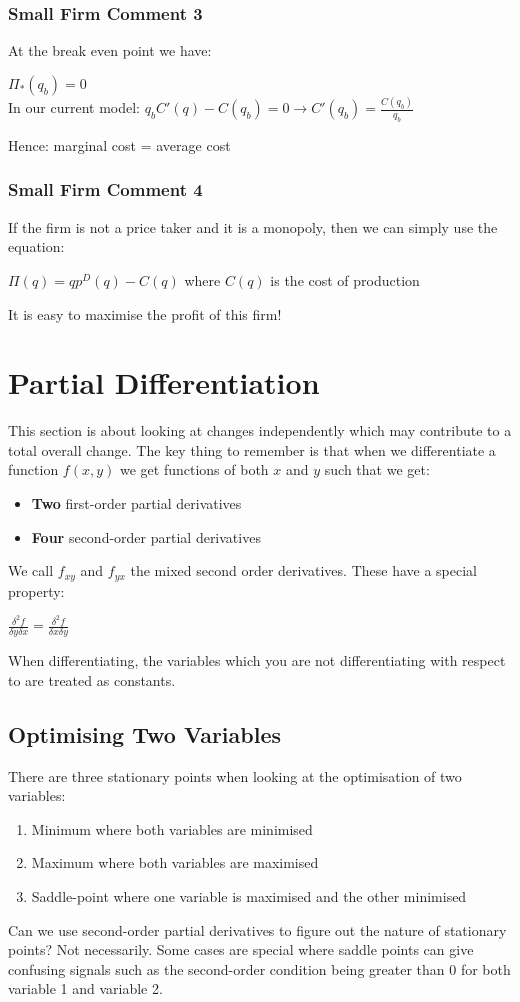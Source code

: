 \documentclass[12pt, letterpaper]{article}
\begin{document}
\subsubsection{Small Firm Comment 3}
At the break even point we have:
\begin{center}
	$\Pi_*(q_b)=0$\\
	In our current model: $q_bC'(q)-C(q_b)=0 \rightarrow C'(q_b)=\frac{C(q_b)}{q_b}$
\end{center}
Hence: marginal cost = average cost

\subsubsection{Small Firm Comment 4}
If the firm is not a price taker and it is a monopoly, then we can simply use the equation:
\begin{center}
	$\Pi(q) = qp^D(q)-C(q)$ where $C(q)$ is the cost of production
\end{center}
It is easy to maximise the profit of this firm!

\section{Partial Differentiation}
This section is about looking at changes independently which may contribute to a total overall change. The key thing to remember is that when we differentiate a function $f(x,y)$ we get functions of both $x$ and $y$ such that we get:
\begin{itemize}
	\item \textbf{Two} first-order partial derivatives
	\item \textbf{Four} second-order partial derivatives
\end{itemize}
We call $f_{xy}$ and $f_{yx}$ the mixed second order derivatives. These have a special property:
\begin{center}
	\Large{$\frac{\delta^2 f}{\delta y \delta x} = \frac{\delta^2f}{\delta x \delta y}$}
\end{center}
When differentiating, the variables which you are not differentiating with respect to are treated as constants.
\subsection{Optimising Two Variables}
There are three stationary points when looking at the optimisation of two variables:
\begin{enumerate}
	\item Minimum where both variables are minimised
	\item Maximum where both variables are maximised
	\item Saddle-point where one variable is maximised and the other minimised
\end{enumerate}
Can we use second-order partial derivatives to figure out the nature of stationary points? Not necessarily. Some cases are special where saddle points can give confusing signals such as the second-order condition being greater than 0 for both variable 1 and variable 2.
\end{document}
